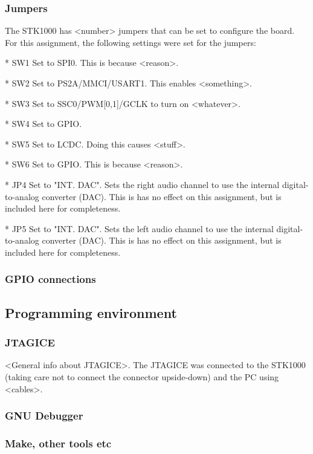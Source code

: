 \documentclass{article}
\begin{document}
\subsubsection{Jumpers}

The STK1000 has <number> jumpers that can be set to configure the board.
For this assignment, the following settings were set for the jumpers:

* SW1
Set to SPI0.
This is because <reason>.


* SW2
Set to PS2A/MMCI/USART1. 
This enables <something>.

* SW3
Set to SSC0/PWM[0,1]/GCLK to turn on <whatever>.

* SW4
Set to GPIO.

* SW5
Set to LCDC.
Doing this causes <stuff>.

* SW6
Set to GPIO.
This is because <reason>.

* JP4
Set to "INT. DAC".
Sets the right audio channel to use the internal digital-to-analog converter (DAC).
This is has no effect on this assignment, but is included here for completeness.

* JP5
Set to "INT. DAC".
Sets the left audio channel to use the internal digital-to-analog converter (DAC).
This is has no effect on this assignment, but is included here for completeness.

\subsubsection{GPIO connections}



\subsection{Programming environment}

\subsubsection{JTAGICE}

<General info about JTAGICE>.
The JTAGICE was connected to the STK1000 (taking care not to connect the connector upside-down) and the PC using <cables>.

\subsubsection{GNU Debugger}

\subsubsection{Make, other tools etc}
\end{document}
